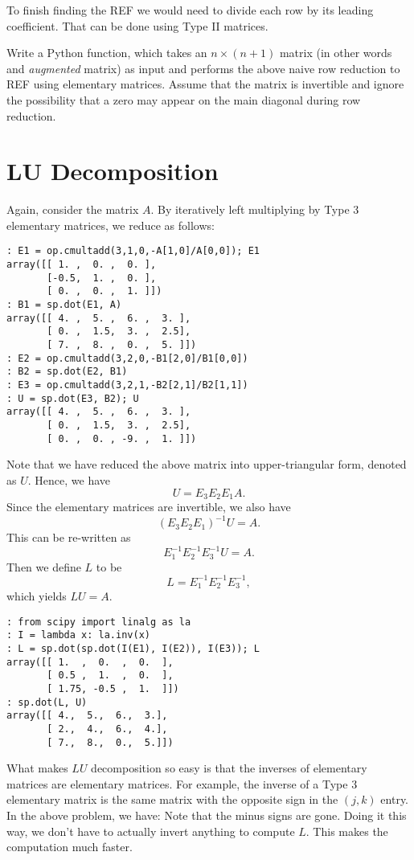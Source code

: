 To finish finding the REF we would need to divide each row by its leading coefficient.
That can be done using Type II matrices.

\begin{problem}
\label{prob:REF}
Write a Python function, which takes an $n\times (n+1)$ matrix (in other words and \emph{augmented} matrix) as input and performs the above naive row reduction to REF using elementary matrices.
Assume that the matrix is invertible and ignore the possibility that a zero may appear on the main diagonal during row reduction.
\end{problem}

\section*{LU Decomposition}

Again, consider the matrix $A$. By iteratively left multiplying by Type 3 elementary matrices, we reduce as follows:

\begin{lstlisting}
: E1 = op.cmultadd(3,1,0,-A[1,0]/A[0,0]); E1
array([[ 1. ,  0. ,  0. ],
       [-0.5,  1. ,  0. ],
       [ 0. ,  0. ,  1. ]])
: B1 = sp.dot(E1, A)
array([[ 4. ,  5. ,  6. ,  3. ],
       [ 0. ,  1.5,  3. ,  2.5],
       [ 7. ,  8. ,  0. ,  5. ]])
: E2 = op.cmultadd(3,2,0,-B1[2,0]/B1[0,0])
: B2 = sp.dot(E2, B1)
: E3 = op.cmultadd(3,2,1,-B2[2,1]/B2[1,1])
: U = sp.dot(E3, B2); U
array([[ 4. ,  5. ,  6. ,  3. ],
       [ 0. ,  1.5,  3. ,  2.5],
       [ 0. ,  0. , -9. ,  1. ]])
\end{lstlisting}
Note that we have reduced the above matrix into upper-triangular form, denoted as $U$.
Hence, we have
\[
U = E_3 E_2 E_1 A.
\]
Since the elementary matrices are invertible, we also have
\[
(E_3 E_2 E_1)^{-1} U =  A.
\]
This can be re-written as
\[
E_1^{-1} E_2^{-1} E_3^{-1} U =  A.
\]
Then we define $L$ to be
\[
L = E_1^{-1} E_2^{-1} E_3^{-1},
\]
which yields $L U = A$.  
\begin{lstlisting}
: from scipy import linalg as la
: I = lambda x: la.inv(x)
: L = sp.dot(sp.dot(I(E1), I(E2)), I(E3)); L
array([[ 1.  ,  0.  ,  0.  ],
       [ 0.5 ,  1.  ,  0.  ],
       [ 1.75, -0.5 ,  1.  ]])
: sp.dot(L, U)
array([[ 4.,  5.,  6.,  3.],
       [ 2.,  4.,  6.,  4.],
       [ 7.,  8.,  0.,  5.]])
\end{lstlisting}
What makes $LU$ decomposition so easy is that the inverses of elementary matrices are elementary matrices.
For example, the inverse of a Type 3 elementary matrix is the same matrix with the opposite sign in the $(j,k)$ entry.
In the above problem, we have:
Note that the minus signs are gone.
Doing it this way, we don't have to actually invert anything to compute $L$.
This makes the computation much faster.

